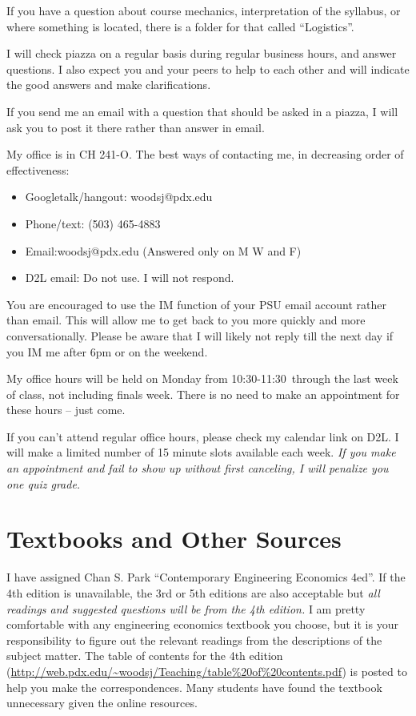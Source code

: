 \documentclass[letterpaper,10pt]{article}
\newcommand{\Office}{on Monday from 10:30-11:30}
\begin{document}
If you have a question about course mechanics, interpretation of the
syllabus, or where something is located, there is a folder for
that called ``Logistics''.

I will check piazza on a regular basis during regular business hours, and answer questions. I also expect you and your peers to help to each other and will indicate the good answers and make clarifications.  

If you send me an email with a question that should be asked in a piazza, I
will ask you to post it there rather than answer in email.


 
My office is in CH 241-O.  The best ways of contacting me, in
decreasing order of effectiveness:
\begin{itemize}
\item Googletalk/hangout: woodsj@pdx.edu
\item Phone/text: (503) 465-4883
\item Email:woodsj@pdx.edu (Answered only on M W and F)
\item D2L email: Do not use.  I will not respond.
\end{itemize}

You are encouraged to use the IM function of your PSU email account rather than email. This will allow me to get back to you more quickly and more conversationally. Please be aware that I will likely not reply till the next day if you IM me after 6pm or on the weekend.  

My office hours will be held \Office ~through the last week of class, not including finals week. There is no need to make an appointment for these hours -- just come.

If you can't attend regular office hours, please check my calendar link on D2L. I will make a limited number of 15 minute slots available each week. \emph{If you make an appointment and fail to show up without first canceling, I will penalize you one quiz grade.}  



\section{Textbooks and Other Sources}
I have assigned Chan S. Park ``Contemporary Engineering Economics
4ed''.  If the 4th edition is unavailable, the 3rd or 5th editions are also
acceptable but \emph{all readings and suggested questions will be from
  the 4th edition.} I am pretty comfortable with any engineering
economics textbook you choose, but it is your responsibility to figure
out the relevant readings from the descriptions of the subject matter.
The table of contents for the 4th edition (\url{http://web.pdx.edu/~woodsj/Teaching/table\%20of\%20contents.pdf}) is posted to help you
make the correspondences.  Many students have found the textbook unnecessary given the online resources.
\end{document}
